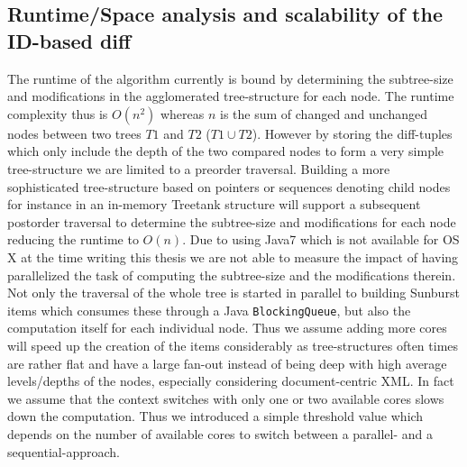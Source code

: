 \subsection{Runtime/Space analysis and scalability of the ID-based diff}
The runtime of the algorithm currently is bound by determining the subtree-size and modifications in the agglomerated tree-structure for each node. The runtime complexity thus is $O(n^2)$ whereas $n$ is the sum of changed and unchanged nodes between two trees $T1$ and $T2$ ($T1 \cup T2$). However by storing the diff-tuples which only include the depth of the two compared nodes to form a very simple tree-structure we are limited to a preorder traversal. Building a more sophisticated tree-structure based on pointers or sequences denoting child nodes for instance in an in-memory Treetank structure will support a subsequent postorder traversal to determine the subtree-size and modifications for each node reducing the runtime to $O(n)$. Due to using Java7 which is not available for OS X at the time writing this thesis we are not able to measure the impact of having parallelized the task of computing the subtree-size and the modifications therein. Not only the traversal of the whole tree is started in parallel to building Sunburst items which consumes these through a Java \texttt{BlockingQueue}, but also the computation itself for each individual node. Thus we assume adding more cores will speed up the creation of the items considerably as tree-structures often times are rather flat and have a large fan-out instead of being deep with high average levels/depths of the nodes, especially considering document-centric XML\cite{ronnau2009efficient}. In fact we assume that the context switches with only one or two available cores slows down the computation. Thus we introduced a simple threshold value which depends on the number of available cores to switch between a parallel- and a sequential-approach. 

